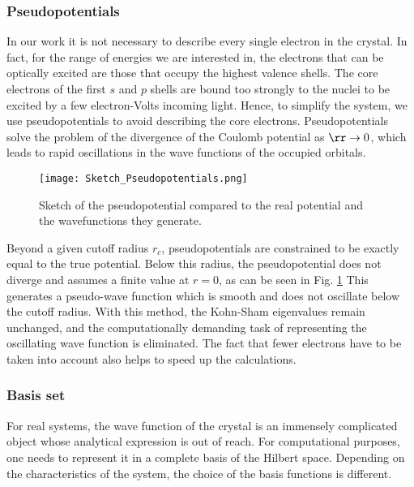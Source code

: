 \subsubsection{Pseudopotentials}
In our work it is not necessary to describe every single electron in the crystal. In fact, for the range of energies we are interested in, the electrons that can be optically excited are those that occupy the highest valence shells.
The core electrons of the first $s$ and $p$ shells are bound too strongly to the nuclei to be excited by a few electron-Volts incoming light. Hence, to simplify the system, we use pseudopotentials to avoid describing the core electrons. Pseudopotentials solve the problem of the divergence of the Coulomb potential as $\rr \to 0$, which leads to rapid oscillations in the wave functions of the occupied orbitals.
\begin{figure}[h!tbp]
	\vspace{0.5cm}
	\setcapindent{2em}
	\centering
	\texttt{[image: Sketch\_Pseudopotentials.png]}
	\caption{Sketch of the pseudopotential compared to the real potential and the wavefunctions they generate.}
	\label{fig:sketch_pseudo}
\end{figure}
Beyond a given cutoff radius $r_c$, pseudopotentials are constrained to be exactly equal to the true potential. Below this radius, the pseudopotential does not diverge and assumes a finite value at $r=0$, as can be seen in Fig. \ref{fig:sketch_pseudo} This generates a pseudo-wave function which is smooth and does not oscillate below the cutoff radius. With this method, the Kohn-Sham eigenvalues remain unchanged, and the computationally demanding task of representing the oscillating wave function is eliminated. The fact that fewer electrons have to be taken into account also helps to speed up the calculations.
%

\subsubsection{Basis set}
For real systems, the wave function of the crystal is an immensely complicated object whose analytical expression is out of reach. For computational purposes, one needs to represent it in a complete basis of the Hilbert space. Depending on the characteristics of the system, the choice of the basis functions is different.

